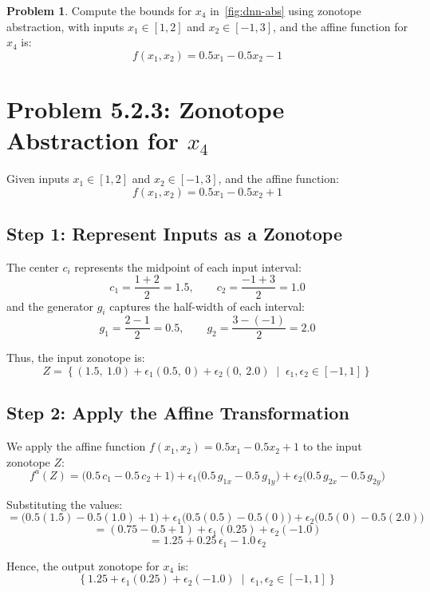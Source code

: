 \documentclass[oneside,11pt,dvipsnames]{book}
\numberwithin{equation}{section}
\theoremstyle{definition}
\newtheorem{problem}{Problem}[section]
\theoremstyle{remark}
\newenvironment{solution}{%
  \ifbool{showsol}{%
    \begin{mysolbox}%
        {\small \textbf{Solution}: }
  }{%
    \comment %
  }%
}{%
  \ifbool{showsol}{%
    \end{mysolbox}%
  }{%
    \endcomment %
  }%
}
\begin{document}
\begin{problem}\label{prob:zonotope_linear_example_x4}
     Compute the bounds for \(x_4\) in~\autoref{fig:dnn-abs} using zonotope abstraction, with inputs \(x_1 \in [1, 2]\) and \(x_2 \in [-1, 3]\), and the affine function for \(x_4\) is:
\[
f(x_1,x_2) = 0.5x_1 -0.5x_2 - 1
\]

\begin{solution}
\section*{Problem 5.2.3: Zonotope Abstraction for $x_4$}

Given inputs $x_1 \in [1, 2]$ and $x_2 \in [-1, 3]$, and the affine function:
\[
f(x_1, x_2) = 0.5x_1 - 0.5x_2 + 1
\]

\subsection*{Step 1: Represent Inputs as a Zonotope}

The center $c_i$ represents the midpoint of each input interval:
\[
c_1 = \frac{1 + 2}{2} = 1.5, \qquad c_2 = \frac{-1 + 3}{2} = 1.0
\]
and the generator $g_i$ captures the half-width of each interval:
\[
g_1 = \frac{2 - 1}{2} = 0.5, \qquad g_2 = \frac{3 - (-1)}{2} = 2.0
\]

Thus, the input zonotope is:
\[
Z = \left\{(1.5,\ 1.0) + \epsilon_1(0.5,\ 0) + \epsilon_2(0,\ 2.0) \;\middle|\; \epsilon_1, \epsilon_2 \in [-1, 1]\right\}
\]

\subsection*{Step 2: Apply the Affine Transformation}

We apply the affine function $f(x_1, x_2) = 0.5x_1 - 0.5x_2 + 1$ to the input zonotope $Z$:
\[
f^a(Z) = \bigl(0.5\,c_1 - 0.5\,c_2 + 1\bigr)
        + \epsilon_1\bigl(0.5\,g_{1x} - 0.5\,g_{1y}\bigr)
        + \epsilon_2\bigl(0.5\,g_{2x} - 0.5\,g_{2y}\bigr)
\]

Substituting the values:
\[
= \bigl(0.5(1.5) - 0.5(1.0) + 1\bigr)
  + \epsilon_1\bigl(0.5(0.5) - 0.5(0)\bigr)
  + \epsilon_2\bigl(0.5(0) - 0.5(2.0)\bigr)
\]
\[
= (0.75 - 0.5 + 1) + \epsilon_1(0.25) + \epsilon_2(-1.0)
\]
\[
= 1.25 + 0.25\,\epsilon_1 - 1.0\,\epsilon_2
\]

Hence, the output zonotope for $x_4$ is:
\[
\left\{1.25 + \epsilon_1(0.25) + \epsilon_2(-1.0) \;\middle|\; \epsilon_1, \epsilon_2 \in [-1, 1]\right\}
\]

\end{solution}
\end{problem}
\end{document}
